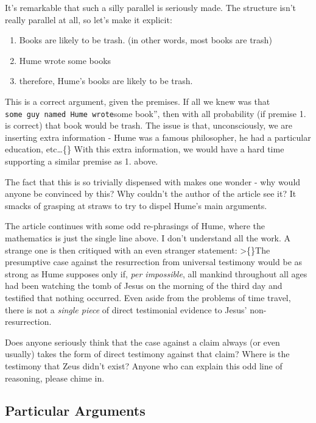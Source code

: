 \documentclass{tufte-book}
\begin{document}
It's remarkable that such a silly parallel is seriously made. The
structure isn't really parallel at all, so let's make it explicit:

\begin{enumerate}
\def\labelenumi{\arabic{enumi}.}
\itemsep1pt\parskip0pt
\item
  Books are likely to be trash. (in other words, most books are trash)
\item
  Hume wrote some books
\item
  therefore, Hume's books are likely to be trash.
\end{enumerate}

This is a correct argument, given the premises. If all we knew was that
\texttt{some\ guy\ named\ Hume\textquotesingle{}\textquotesingle{}\ wrote}some
book'', then with all probability (if premise 1. is correct) that book
would be trash. The issue is that, unconsciously, we are inserting extra
information - Hume was a famous philosopher, he had a particular
education, etc\ldots\{\} With this extra information, we would have a
hard time supporting a similar premise as 1. above.

The fact that this is so trivially dispensed with makes one wonder - why
would anyone be convinced by this? Why couldn't the author of the
article see it? It smacks of grasping at straws to try to dispel Hume's
main arguments.

The article continues with some odd re-phrasings of Hume, where the
mathematics is just the single line above. I don't understand all the
work. A strange one is then critiqued with an even stranger statement:
\textgreater\{\}The presumptive case against the resurrection from
universal testimony would be as strong as Hume supposes only if,
\emph{per impossible}, all mankind throughout all ages had been watching
the tomb of Jesus on the morning of the third day and testified that
nothing occurred. Even aside from the problems of time travel, there is
not a \emph{single piece} of direct testimonial evidence to Jesus'
non-resurrection.

Does anyone seriously think that the case against a claim always (or
even usually) takes the form of direct testimony against that claim?
Where is the testimony that Zeus didn't exist? Anyone who can explain
this odd line of reasoning, please chime in.

\subsection{Particular Arguments}\label{particular-arguments}
\end{document}
